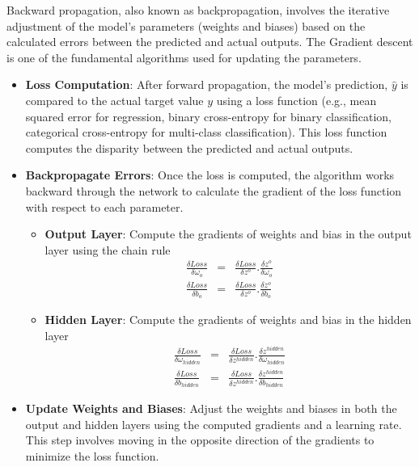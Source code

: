 Backward propagation, also known as backpropagation, involves the iterative adjustment of the model's parameters (weights and biases) based on the calculated errors between the predicted and actual outputs. The Gradient descent is one of the fundamental algorithms used for updating the parameters. 
\begin{itemize}[f1]
  \item\textbf{Loss Computation}: After forward propagation, the model's prediction, $\hat{y}$ is compared to the actual target value $y$ using a loss function (e.g., mean squared error for regression, binary cross-entropy for binary classification, categorical cross-entropy for multi-class classification). This loss function computes the disparity between the predicted and actual outputs. 
  \item \textbf{Backpropagate Errors}: Once the loss is computed, the algorithm works backward through the network to calculate the gradient of the loss function with respect to each parameter. 
      \begin{itemize}
        \item \textbf{Output Layer}: Compute the gradients of weights and bias in the output layer using the chain rule
        \begin{eqnarray}\label{eqn:gradient1}
          \frac{\delta Loss}{\delta \omega_o} &=& \frac{\delta Loss}{\delta z^o } . \frac{\delta z^o}{\delta \omega_o}\\
         \frac{\delta Loss}{\delta b_o} &=& \frac{\delta Loss}{\delta z^o } . \frac{\delta z^o}{\delta b_o}
        \end{eqnarray}
        \item \textbf{Hidden Layer}: Compute the gradients of weights and bias in the hidden layer 
        \begin{eqnarray}\label{eqn:gradient2}
          \frac{\delta Loss}{\delta \omega_{hidden}} &=& \frac{\delta Loss}{\delta z^{hidden} } . \frac{\delta z^{hidden}}{\delta \omega_{hidden}}\\
         \frac{\delta Loss}{\delta b_{hidden}}           &=& \frac{\delta Loss}{\delta z^{hidden} } . \frac{\delta z^{hidden}}{\delta b_{hidden}}
        \end{eqnarray}
      \end{itemize}
  \item \textbf{Update Weights and Biases}: Adjust the weights and biases in both the output and hidden layers using the computed gradients and a learning rate. This step involves moving in the opposite direction of the gradients to minimize the loss function. 

\end{itemize}
